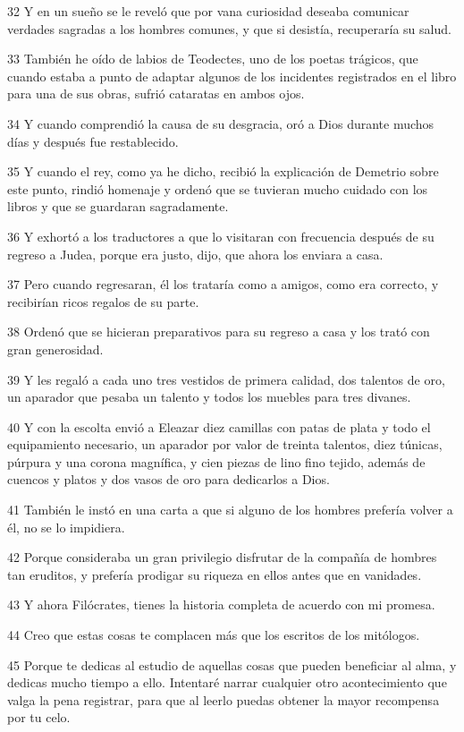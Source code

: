 \par 32 Y en un sueño se le reveló que por vana curiosidad deseaba comunicar verdades sagradas a los hombres comunes, y que si desistía, recuperaría su salud.

\par 33 También he oído de labios de Teodectes, uno de los poetas trágicos, que cuando estaba a punto de adaptar algunos de los incidentes registrados en el libro para una de sus obras, sufrió cataratas en ambos ojos.

\par 34 Y cuando comprendió la causa de su desgracia, oró a Dios durante muchos días y después fue restablecido.

\par 35 Y cuando el rey, como ya he dicho, recibió la explicación de Demetrio sobre este punto, rindió homenaje y ordenó que se tuvieran mucho cuidado con los libros y que se guardaran sagradamente.

\par 36 Y exhortó a los traductores a que lo visitaran con frecuencia después de su regreso a Judea, porque era justo, dijo, que ahora los enviara a casa.

\par 37 Pero cuando regresaran, él los trataría como a amigos, como era correcto, y recibirían ricos regalos de su parte.

\par 38 Ordenó que se hicieran preparativos para su regreso a casa y los trató con gran generosidad.

\par 39 Y les regaló a cada uno tres vestidos de primera calidad, dos talentos de oro, un aparador que pesaba un talento y todos los muebles para tres divanes.

\par 40 Y con la escolta envió a Eleazar diez camillas con patas de plata y todo el equipamiento necesario, un aparador por valor de treinta talentos, diez túnicas, púrpura y una corona magnífica, y cien piezas de lino fino tejido, además de cuencos y platos y dos vasos de oro para dedicarlos a Dios.

\par 41 También le instó en una carta a que si alguno de los hombres prefería volver a él, no se lo impidiera.

\par 42 Porque consideraba un gran privilegio disfrutar de la compañía de hombres tan eruditos, y prefería prodigar su riqueza en ellos antes que en vanidades.

\par 43 Y ahora Filócrates, tienes la historia completa de acuerdo con mi promesa.

\par 44 Creo que estas cosas te complacen más que los escritos de los mitólogos.

\par 45 Porque te dedicas al estudio de aquellas cosas que pueden beneficiar al alma, y ​​dedicas mucho tiempo a ello. Intentaré narrar cualquier otro acontecimiento que valga la pena registrar, para que al leerlo puedas obtener la mayor recompensa por tu celo.


